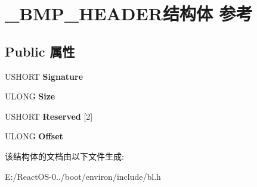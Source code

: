 \hypertarget{struct___b_m_p___h_e_a_d_e_r}{}\section{\+\_\+\+B\+M\+P\+\_\+\+H\+E\+A\+D\+E\+R结构体 参考}
\label{struct___b_m_p___h_e_a_d_e_r}
\subsection*{Public 属性}
\begin{DoxyCompactItemize}
\item 
\mbox{\label{struct___b_m_p___h_e_a_d_e_r_ab6794a2127df0bd716f89c9461591b6a}} 
U\+S\+H\+O\+RT {\bfseries Signature}
\item 
\mbox{\label{struct___b_m_p___h_e_a_d_e_r_ab1ac1fb2eb4e5f270df58da2b10573a6}} 
U\+L\+O\+NG {\bfseries Size}
\item 
\mbox{\label{struct___b_m_p___h_e_a_d_e_r_a7818f566745b2933c4a253599c4199c2}} 
U\+S\+H\+O\+RT {\bfseries Reserved} \mbox{[}2\mbox{]}
\item 
\mbox{\label{struct___b_m_p___h_e_a_d_e_r_ac697a3432ae2766048da436036c8cfb7}} 
U\+L\+O\+NG {\bfseries Offset}
\end{DoxyCompactItemize}


该结构体的文档由以下文件生成\+:\begin{DoxyCompactItemize}
\item 
E\+:/\+React\+O\+S-\/0../boot/environ/include/bl.\+h\end{DoxyCompactItemize}
